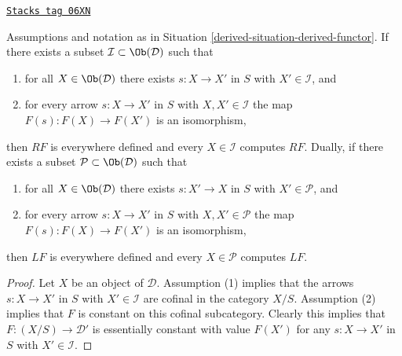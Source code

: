 \begin{lemma}
\label{derived-lemma-find-existence-computes}
\href{https://stacks.math.columbia.edu/tag/06XN}{\texttt{Stacks tag 06XN}}

Assumptions and notation as in
Situation \ref{derived-situation-derived-functor}.
If there exists a subset $\mathcal{I} \subset \Ob(\mathcal{D})$
such that
\begin{enumerate}
\item for all $X \in \Ob(\mathcal{D})$
there exists $s : X \to X'$ in $S$ with $X' \in \mathcal{I}$,
and
\item for every arrow $s : X \to X'$ in $S$ with $X, X' \in \mathcal{I}$
the map $F(s) : F(X) \to F(X')$ is an isomorphism,
\end{enumerate}
then $RF$ is everywhere defined and every $X \in \mathcal{I}$
computes $RF$. Dually, if there exists a subset
$\mathcal{P} \subset \Ob(\mathcal{D})$
such that
\begin{enumerate}
\item for all $X \in \Ob(\mathcal{D})$
there exists $s : X' \to X$ in $S$ with $X' \in \mathcal{P}$,
and
\item for every arrow $s : X \to X'$ in $S$ with $X, X' \in \mathcal{P}$
the map $F(s) : F(X) \to F(X')$ is an isomorphism,
\end{enumerate}
then $LF$ is everywhere defined and every $X \in \mathcal{P}$
computes $LF$.
\end{lemma}

\begin{proof}
Let $X$ be an object of $\mathcal{D}$.
Assumption (1) implies that the arrows $s : X \to X'$ in $S$ with
$X' \in \mathcal{I}$ are cofinal in the category $X/S$. Assumption
(2) implies that $F$ is constant on this cofinal subcategory.
Clearly this implies that $F : (X/S) \to \mathcal{D}'$ is essentially
constant with value $F(X')$ for any $s : X \to X'$ in $S$
with $X' \in \mathcal{I}$.
\end{proof}

